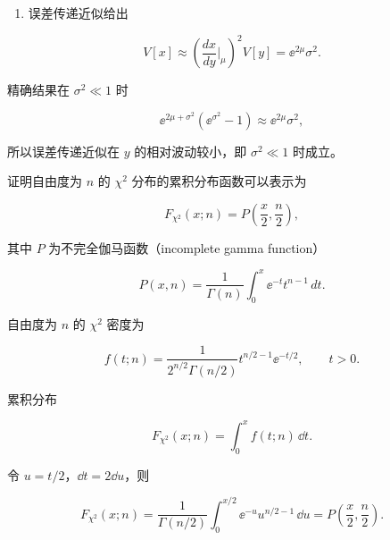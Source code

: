 \begin{question}
\begin{solution}
\begin{enumerate}[start=3]
\item
  误差传递近似给出
\end{enumerate}

\[
V[x]\approx \left(\frac{dx}{dy}\bigg|_{\mu}\right)^2V[y]=\ee^{2\mu}\sigma^2.
\]

精确结果在 \(\sigma^2\ll1\) 时

\[
\ee^{2\mu+\sigma^2}(\ee^{\sigma^2}-1)
\approx \ee^{2\mu}\sigma^2,
\]

所以误差传递近似在 \(y\) 的相对波动较小，即 \(\sigma^2\ll1\) 时成立。
\end{solution}
\end{question}


\begin{question}
证明自由度为 \(n\) 的 \(\chi^2\) 分布的累积分布函数可以表示为

\[
F_{\chi^2}(x;n)=P\left(\frac{x}{2},\frac{n}{2}\right),
\]

其中 \(P\) 为不完全伽马函数（incomplete gamma function）

\[
P(x,n)=\frac{1}{\Gamma(n)}\int_0^x \ee^{-t}t^{n-1}\,dt.
\]
\begin{solution}
自由度为 \(n\) 的 \(\chi^2\) 密度为

\[
f(t;n)=\frac{1}{2^{n/2}\Gamma(n/2)}t^{n/2-1}\ee^{-t/2},\qquad t>0.
\]

累积分布

\[
F_{\chi^2}(x;n)=\int_0^x f(t;n)\,\dd{t}.
\]

令 \(u=t/2\)，\(\dd{t}=2\dd{u}\)，则

\[
F_{\chi^2}(x;n)=\frac{1}{\Gamma(n/2)}\int_0^{x/2}\ee^{-u}u^{n/2-1}\,\dd{u}
=P\left(\frac{x}{2},\frac{n}{2}\right).
\]
\end{solution}
\end{question}

